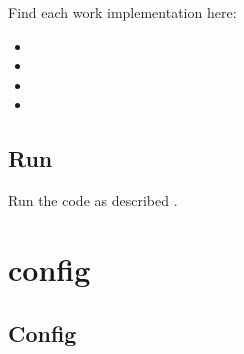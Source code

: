 \documentclass[letterpaper,10pt,english]{sphinxmanual}
\begin{document}
Find each work implementation here:
\begin{itemize}
\item {} 

\item {} 

\item {} 

\item {} 

\end{itemize}


\subsection{Run}
\label{\detokenize{manuscripts/stable_mitochondria:run}}
Run the code as described .


\section{config}
\label{\detokenize{config/main_config:config}}\label{\detokenize{config/main_config::doc}}\label{\detokenize{config/main_config::doc}}

\subsection{Config}
\label{\detokenize{config/config:module-config.config}}\label{\detokenize{config/config:config}}\label{\detokenize{config/config::doc}}
\end{document}

